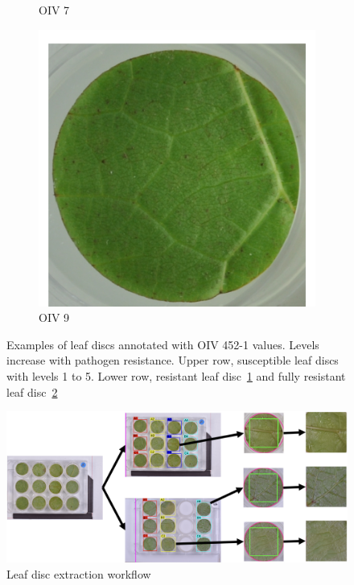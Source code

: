 \documentclass[english]{article}
\begin{document}
\begin{figure}[H]
\begin{subfigure}[b]{0.3\linewidth}
        \caption{OIV 7}\label{fig:oiv7}
    \end{subfigure}
    \begin{subfigure}[b]{0.3\linewidth}
        \includegraphics[width=\linewidth]{oiv9.png}
        \caption{OIV 9}\label{fig:oiv9}
    \end{subfigure}
    \caption{Examples of leaf discs annotated with OIV 452-1 values. Levels increase with pathogen resistance. Upper row, susceptible leaf discs with levels 1 to 5. Lower row, resistant leaf disc~\ref{fig:oiv7} and fully resistant leaf disc~\ref{fig:oiv9}}\label{fig:phenotypes}
\end{figure}

\begin{figure}[H]
    \begin{center}
        \includegraphics[width=0.9\linewidth]{2023_a_oiv_indexation}
        \caption{Leaf disc extraction workflow}\label{fig:preprocessing}
    \end{center}
\end{figure}
\end{document}
